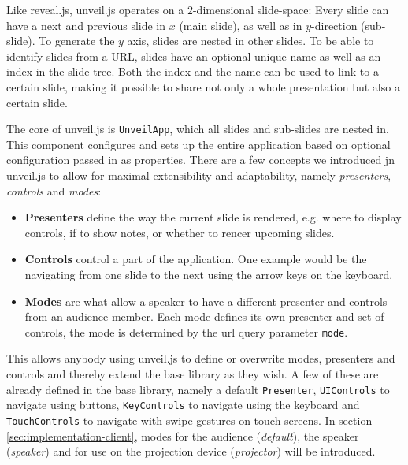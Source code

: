 Like reveal.js, unveil.js operates on a $2$-dimensional slide-space: Every slide can have a next and previous slide in $x$ (main slide), as well as in $y$-direction (sub-slide). To generate the $y$ axis, slides are nested in other slides.
To be able to identify slides from a URL, slides have an optional unique name as well as an index in the slide-tree. Both the index and the name can be used to link to a certain slide, making it possible to share not only a whole presentation but also a certain slide.

The core of unveil.js is \texttt{UnveilApp}, which all slides and sub-slides are nested in. This component configures and sets up the entire application based on optional configuration passed in as properties. There are a few concepts we introduced jn unveil.js to allow for maximal extensibility and adaptability, namely \emph{presenters}, \emph{controls} and \emph{modes}:
%
\begin{itemize}
\item \textbf{Presenters} define the way the current slide is rendered, e.g. where to display controls, if to show notes, or whether to rencer upcoming slides.
\item \textbf{Controls} control a part of the application. One example would be the navigating from one slide to the next using the arrow keys on the keyboard.
\item \textbf{Modes} are what allow a speaker to have a different presenter and controls from an audience member. Each mode defines its own presenter and set of controls, the mode is determined by the url query parameter \texttt{mode}.
\end{itemize}
This allows anybody using unveil.js to define or overwrite modes, presenters and controls and thereby extend the base library as they wish. A few of these are already defined in the base library, namely a default \texttt{Presenter}, \texttt{UIControls} to navigate using buttons, \texttt{KeyControls} to navigate using the keyboard and \texttt{TouchControls} to navigate with swipe-gestures on touch screens. In section \ref{sec:implementation-client}, modes for the audience (\emph{default}), the speaker (\emph{speaker}) and for use on the projection device (\emph{projector}) will be introduced.

